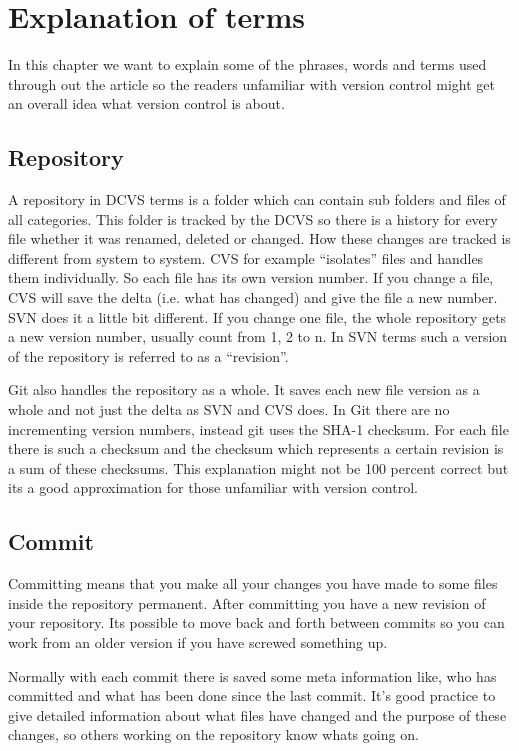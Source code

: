 \section{Explanation of terms}\label{explanationofterms}

In this chapter we want to explain some of the phrases, words and terms used through out the article so the 
readers unfamiliar with version control might get an overall idea what version control is about.

\subsection{Repository}

A repository in DCVS terms is a folder which can contain sub folders and files of all categories. 
This folder is tracked by the DCVS so there is a history for every file whether it was renamed, deleted or changed. 
How these changes are tracked is different from system to system. CVS for example “isolates” 
files and handles them individually. So each file has its own version number. If you change a file, CVS will 
save the delta (i.e. what has changed) and give the file a new number. SVN does it a little bit 
different. If you change one file, the whole repository gets a new version number, usually count from 1, 2 to n. 
In SVN terms such a version of the repository is referred to as a “revision”.

Git also handles the repository as a whole. It saves each new file version as a whole and not just the delta as SVN and CVS does. 
In Git there are no incrementing version numbers, instead git uses the SHA-1 checksum. For each file there is such a 
checksum and the checksum which represents a certain revision is a sum of these checksums. 
This explanation might not be 100 percent correct but its a good approximation for those unfamiliar with version control.


\subsection{Commit}

Committing means that you make all your changes you have made to some files inside the repository permanent. 
After committing you have a new revision of your repository. Its possible to move back and forth between commits so you can work 
from an older version if you have screwed something up.

Normally with each commit there is saved some meta information like, who has committed and what has been done since the last commit. 
It's good practice to give detailed information about what files have changed and the purpose of these changes, so others working 
on the repository know whats going on.


